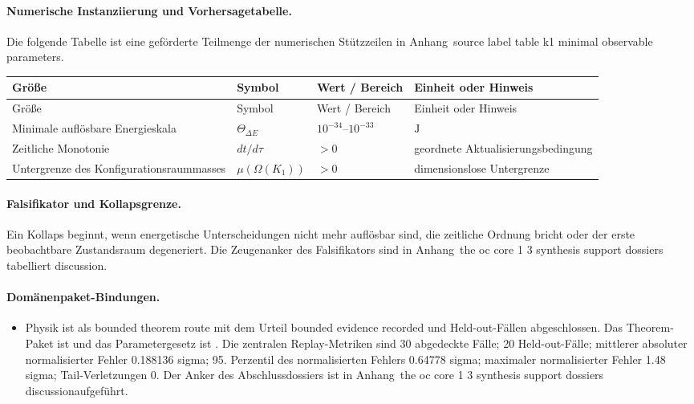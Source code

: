\paragraph{Numerische Instanziierung und Vorhersagetabelle.}
Die folgende Tabelle ist eine geförderte Teilmenge der numerischen Stützzeilen in Anhang~source label table k1 minimal observable parameters.
\begin{longtable}{@{}L{0.27\textwidth}L{0.15\textwidth}L{0.24\textwidth}L{0.16\textwidth}@{}}
\toprule
Größe & Symbol & Wert / Bereich & Einheit oder Hinweis \\
\midrule
\endfirsthead
\toprule
Größe & Symbol & Wert / Bereich & Einheit oder Hinweis \\
\midrule
\endhead
Minimale auflösbare Energieskala & $\scriptstyle \Theta_{\Delta E}$ & $10^{-34}\text{--}10^{-33}$ & $\mathrm{J}$ \\
Zeitliche Monotonie & $\scriptstyle dt/\allowbreak d\tau$ & $> 0$ & geordnete Aktualisierungsbedingung \\
Untergrenze des Konfigurationsraummasses & $\scriptstyle \mu(\Omega(K_1))$ & $> 0$ & dimensionslose Untergrenze \\
\bottomrule
\end{longtable}

\paragraph{Falsifikator und Kollapsgrenze.}
Ein Kollaps beginnt, wenn energetische Unterscheidungen nicht mehr auflösbar sind, die zeitliche Ordnung bricht oder der erste beobachtbare Zustandsraum degeneriert.
Die Zeugenanker des Falsifikators sind in Anhang~the oc core 1 3 synthesis support dossiers tabelliert discussion.

\paragraph{Domänenpaket-Bindungen.}
\begin{itemize}[leftmargin=1.6em,nosep]
\item Physik ist als bounded theorem route mit dem Urteil bounded evidence recorded und  Held-out-Fällen abgeschlossen. Das Theorem-Paket ist  und das Parametergesetz ist . Die zentralen Replay-Metriken sind 30 abgedeckte Fälle; 20 Held-out-Fälle; mittlerer absoluter normalisierter Fehler 0.188136 sigma; 95. Perzentil des normalisierten Fehlers 0.64778 sigma; maximaler normalisierter Fehler 1.48 sigma; Tail-Verletzungen 0. Der Anker des Abschlussdossiers ist in Anhang~the oc core 1 3 synthesis support dossiers discussionaufgeführt.
\end{itemize}

